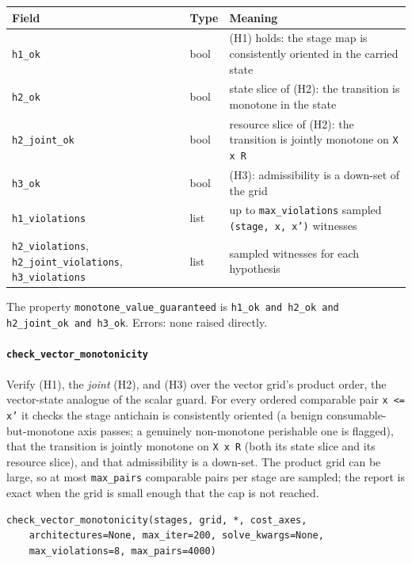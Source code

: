 \documentclass[11pt,a4paper]{article}
\begin{document}
\begin{center}
\begin{tabular}{@{}llp{}@{}}
\toprule
Field & Type & Meaning \\
\midrule
\texttt{h1\_ok} & bool & (H1) holds: the stage map is consistently oriented
  in the carried state \\
\texttt{h2\_ok} & bool & state slice of (H2): the transition is monotone in
  the state \\
\texttt{h2\_joint\_ok} & bool & resource slice of (H2): the transition is
  jointly monotone on \texttt{X x R} \\
\texttt{h3\_ok} & bool & (H3): admissibility is a down-set of the grid \\
\texttt{h1\_violations} & list & up to \texttt{max\_violations} sampled
  \texttt{(stage, x, x')} witnesses \\
\texttt{h2\_violations}, \texttt{h2\_joint\_violations},
  \texttt{h3\_violations} & list & sampled witnesses for each hypothesis \\
\bottomrule
\end{tabular}
\end{center}
The property \texttt{monotone\_value\_guaranteed} is \texttt{h1\_ok and
h2\_ok and h2\_joint\_ok and h3\_ok}. Errors: none raised directly.

\paragraph{\texttt{check\_vector\_monotonicity}}\label{ref:vector_dp:check_vector_monotonicity}
Verify (H1), the \emph{joint} (H2), and (H3) over the vector grid's product
order, the vector-state analogue of the scalar guard. For every ordered
comparable pair \texttt{x <= x'} it checks the stage antichain is
consistently oriented (a benign consumable-but-monotone axis passes; a
genuinely non-monotone perishable one is flagged), that the transition is
jointly monotone on \texttt{X x R} (both its state slice and its resource
slice), and that admissibility is a down-set. The product grid can be large,
so at most \texttt{max\_pairs} comparable pairs per stage are sampled; the
report is exact when the grid is small enough that the cap is not reached.

\begin{lstlisting}
check_vector_monotonicity(stages, grid, *, cost_axes,
    architectures=None, max_iter=200, solve_kwargs=None,
    max_violations=8, max_pairs=4000)
\end{lstlisting}
\end{document}
